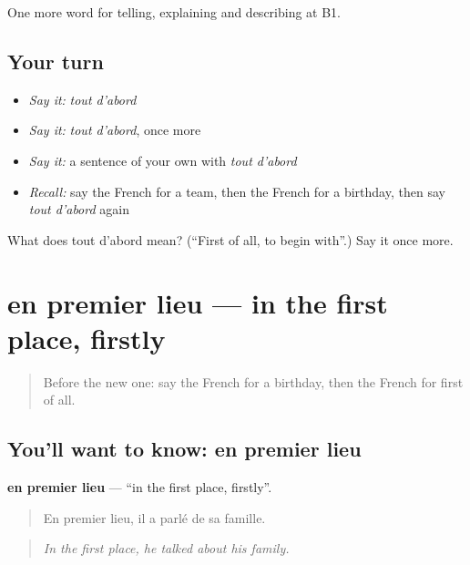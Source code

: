 \begin{grammarlens}[title={What you've built}]
One more word for telling, explaining and describing at B1.
\end{grammarlens}

\subsection*{Your turn}
\begin{itemize}
\raggedright
  \item \emph{Say it:} \emph{tout d'abord}
  \item \emph{Say it:} \emph{tout d'abord}, once more
  \item \emph{Say it:} a sentence of your own with \emph{tout d'abord}
  \item \emph{Recall:} say the French for a team, then the French for a birthday, then say \emph{tout d'abord} again
\end{itemize}

\begin{tcolorbox}[breakable,colback=teal!4,colframe=teal!35!black,title={Before you move on}]
What does tout d'abord mean? (\textquotedblleft{}First of all, to begin with\textquotedblright{}.) Say it once more.
\end{tcolorbox}
\section[en premier lieu]{en premier lieu — in the first place, firstly}

\label{lesson:FR-C268-en-premier-lieu}



\begin{quote}
Before the new one: say the French for a birthday, then the French for first of all.
\end{quote}

\subsection*{You'll want to know: en premier lieu}
\textbf{en premier lieu} — \textquotedblleft{}in the first place, firstly\textquotedblright{}.

\begin{quote}
En premier lieu, il a parlé de sa famille.
\end{quote}

\begin{quote}
\emph{In the first place, he talked about his family.}
\end{quote}

